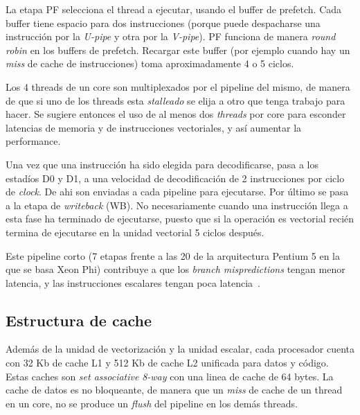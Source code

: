 La etapa PF selecciona el thread a ejecutar, usando el buffer de prefetch. Cada buffer tiene espacio para dos
instrucciones (porque puede despacharse una instrucci\'on por la \textit{U-pipe} y otra por la \textit{V-pipe}). PF
funciona de manera \textit{round robin} en los buffers de prefetch. Recargar este buffer (por ejemplo cuando hay un
\textit{miss} de cache de instrucciones) toma aproximadamente 4 o 5 ciclos.

Los 4 threads de un core son multiplexados por el pipeline del mismo, de manera de que si uno de los threads esta
\textit{stalleado} se elija a otro que tenga trabajo para hacer. Se sugiere entonces el uso de al menos dos
\textit{threads} por core para esconder latencias de memoria y de instrucciones vectoriales, y as\'i aumentar la performance.

Una vez que una instrucci\'on ha sido elegida para decodificarse, pasa a los estad\'ios D0 y D1, a una velocidad de
decodificaci\'on de 2 instrucciones por ciclo de \textit{clock}. De ahi son enviadas a cada pipeline para ejecutarse.
Por \'ultimo se pasa a la etapa de \textit{writeback} (WB). No necesariamente cuando una instrucci\'on llega a esta
fase ha terminado de ejecutarse, puesto que si la operaci\'on es vectorial reci\'en termina de ejecutarse en la unidad
vectorial 5 ciclos despu\'es.

Este pipeline corto (7 etapas frente a las 20 de la arquitectura Pentium 5 en la que se basa Xeon Phi) contribuye a que
los \textit{branch mispredictions} tengan menor latencia, y las instrucciones escalares tengan poca latencia~\cite{IntelXeonPhiWhitePaper}.

\subsection{Estructura de cache}

Adem\'as de la unidad de vectorizaci\'on y la unidad escalar, cada procesador cuenta con 32 Kb de cache L1 y 512 Kb de cache
L2 unificada para datos y c\'odigo. Estas caches son \textit{set associative} \textit{8-way} con una linea de cache de 64 bytes.
La cache de datos es no bloqueante, de manera que un \textit{miss} de cache de un thread en un core,
no se produce un \textit{flush} del pipeline en los dem\'as threads.

